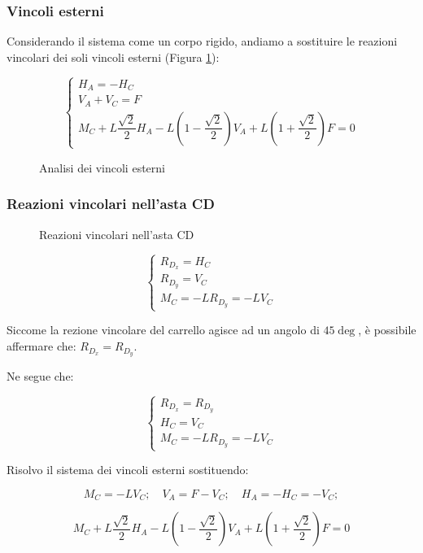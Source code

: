 \documentclass[main.tex]{subfiles}
\begin{document}
\subsubsection{Vincoli esterni}
Considerando il sistema come un corpo rigido, andiamo a sostituire le reazioni vincolari dei soli vincoli esterni (Figura \ref{vincoli_esterni_2014_1009_2}):

\[
	\begin{cases}
		H_A = -H_C \\
		V_A + V_C = F\\
		M_C + L\dfrac{\sqrt{2}}{2}H_A - L(1 - \dfrac{\sqrt{2}}{2})V_A + L(1+\dfrac{\sqrt{2}}{2})F = 0
	\end{cases}
\]

\begin{figure}[H]
\centering
\resizebox{.5\textwidth}{!}{}
\caption{Analisi dei vincoli esterni}
\label{vincoli_esterni_2014_1009_2}
\end{figure}

\subsubsection{Reazioni vincolari nell'asta CD}

\begin{figure}[H]
\centering
\resizebox{.5\textwidth}{!}{}
\caption{Reazioni vincolari nell'asta CD}
\end{figure}

\[
	\begin{cases}
	R_{D_x} = H_C\\
	R_{D_y} = V_C\\
	M_C = -LR_{D_y} = -LV_C
	\end{cases}
\]

Siccome la rezione vincolare del carrello agisce ad un angolo di $45\deg$, è possibile affermare che: $R_{D_x} = R_{D_y}$.

Ne segue che:

\[
	\begin{cases}
	R_{D_x} = R_{D_y}\\
	H_C = V_C\\
	M_C = -LR_{D_y} = -LV_C
	\end{cases}
\]

Risolvo il sistema dei vincoli esterni sostituendo:

\[
	M_C = -LV_C;\quad
	V_A = F - V_C;\quad
	H_A = -H_C = -V_C;
\]

\begin{equation}
	M_C + L\dfrac{\sqrt{2}}{2}H_A - L(1 - \dfrac{\sqrt{2}}{2})V_A + L(1+\dfrac{\sqrt{2}}{2})F = 0
\end{equation}
\end{document}
